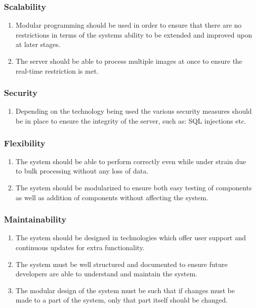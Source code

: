 \documentclass[a4paper,12pt]{report}
\begin{document}
\subsubsection{Scalability}
\begin{enumerate}
	\item Modular programming should be used in order to ensure that there are no restrictions in terms of the systems ability to be extended and improved upon at later stages.
	\item The server should be able to process multiple images at once to ensure the real-time restriction is met.
\end{enumerate}
\subsubsection{Security}
\begin{enumerate}
	\item Depending on the technology being used the various security measures should be in place to ensure the integrity of the server, such as: SQL injections etc.
\end{enumerate}
\subsubsection{Flexibility}
\begin{enumerate}
	\item The system should be able to perform correctly even while under strain due to bulk processing without any loss of data.
	\item The system should be modularized to ensure both easy testing of components as well as addition of components without affecting the system.
\end{enumerate}
\subsubsection{Maintainability}
\begin{enumerate}
	\item The system should be designed in technologies which offer user support and continuous updates for extra functionality.
	\item The system must be well structured and documented to ensure future developers are able to understand and maintain the system.
	\item The modular design of the system must be such that if changes must be made to a part of the system, only that part itself should be changed.
\end{enumerate}
\end{document}
